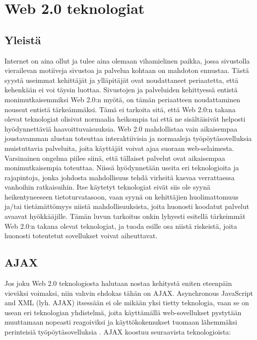 
\chapter{Web 2.0 teknologiat}

\section{Yleistä}

Internet on aina ollut ja tulee aina olemaan vihamielinen paikka, jossa sivustolla vierailevan motiiveja sivustoa ja palvelua kohtaan on mahdoton ennustaa. Tästä syystä 
useimmat kehittäjät ja ylläpitäjät ovat noudattaneet periaatetta, että kehenkään ei voi täysin luottaa. Sivustojen ja palveluiden kehittyessä entistä monimutkaisemmiksi
Web 2.0:n myötä, on tämän periaatteen noudattaminen noussut entistä tärkeämmäksi. Tämä ei tarkoita sitä, että Web 2.0:n takana olevat teknologiat olisivat normaalia 
heikompia tai että ne sisältäisivät helposti hyödynnettäviä haavoittuvaisuuksia. Web 2.0 mahdollistaa vain aikaisempaa joustavamman alustan toteuttaa interaktiivisia ja
normaaleja työpöytäsovelluksia muistuttavia palveluita, joita käyttäjät voivat ajaa suoraan web-selaimesta. Varsinainen ongelma piilee siinä, että tällaiset palvelut ovat 
aikaisempaa monimutkaisempia toteuttaa. Niissä hyödynnetään useita eri teknologioita ja rajapintoja, jonka johdosta mahdollisuus tehdä virheitä kasvaa verrattaessa
vanhoihin ratkaisuihin. Itse käytetyt teknologiat eivät siis ole syynä heikentyneeseen tietoturvatasoon, vaan syynä on kehittäjien huolimattomuus ja/tai tietämättömyys 
niistä mahdollisuuksista, joita huonosti koodatut palvelut avaavat hyökkääjille. Tämän luvun tarkoitus onkin lyhyesti esitellä tärkeimmät Web 2.0:n takana olevat teknologiat, 
ja tuoda esille osa niistä riskeistä, joita huonosti toteutetut sovellukset voivat aiheuttavat. 

\section {AJAX}

Jos joku Web 2.0 teknologiosta halutaan nostaa kehitystä eniten eteenpäin vieväksi voimaksi, niin vahvin ehdokas tähän on AJAX.  Asynchronous JavaScript and XML (lyh. AJAX)
itsessään ei ole mikään yksi tietty teknologia, vaan se on usean eri teknologian yhdistelmä, joita käyttämällä web-sovellukset pystytään muuttamaan nopeasti reagoiviksi
ja käyttökokemukset tuomaan lähemmäksi perinteisiä työpöytäsovelluksia \cite{AJAX}. AJAX koostuu seuraavista teknologioista:

